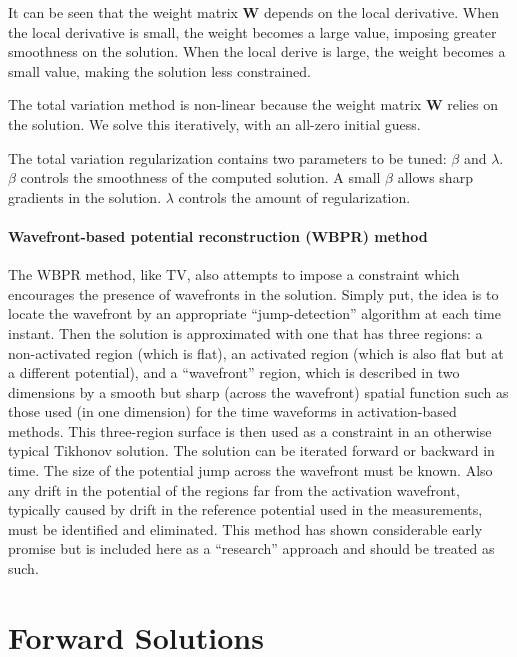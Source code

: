\documentclass[fleqn,11pt,openany]{book}
\begin{document}
It can be seen that the weight matrix $\mathbf{W}$ depends on the local
derivative. When the local derivative is small, the weight becomes a large
value, imposing greater smoothness on the solution. When the local derive
is large, the weight becomes a small value, making the solution less
constrained.

The total variation method is non-linear because the weight matrix
$\mathbf{W}$ relies on the solution. We solve this iteratively, with an all-zero initial
guess.

The total variation regularization contains two parameters to be tuned:
$\beta$ and $\lambda$. $\beta$ controls the smoothness of the computed
solution. A small $\beta$ allows sharp gradients in the solution. $\lambda$
controls the amount of regularization.

\subsubsection{Wavefront-based potential reconstruction (WBPR) method}

The WBPR method, like TV, also attempts to impose a constraint which
encourages the presence of wavefronts in the solution. Simply put, the idea
is to locate the wavefront by an appropriate ``jump-detection'' algorithm at each time instant.
Then the solution is approximated with one that has three regions: a non-activated region (which is flat), an
activated region (which is also flat but at a different potential), and a
``wavefront'' region, which is described in two dimensions by a smooth but
sharp (across the wavefront) spatial function such as those used (in one
dimension) for the time waveforms in activation-based methods. This
three-region surface is then used as a constraint in an otherwise typical
Tikhonov solution. The solution can be iterated forward or backward in
time.
The size of the potential jump across the wavefront must be known.
Also any drift in the potential of the regions far from the
activation wavefront, typically caused by drift in the reference potential
used in the measurements, must be identified and eliminated. This method has
shown considerable early promise but is included here as a ``research''
approach and should be treated as such.


%
\chapter{Forward Solutions}\label{ch:fwd}
\end{document}
